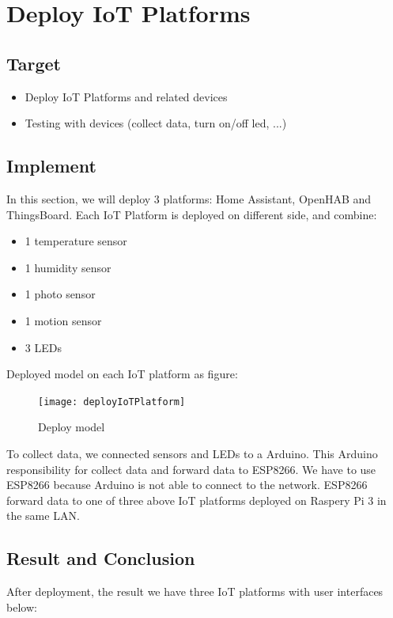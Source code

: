 \documentclass[runningheads,a4paper]{llncs}
\begin{document}
\section{Deploy IoT Platforms}
\subsection{Target}
\begin{itemize}
\item Deploy IoT Platforms and related devices
\item Testing with devices (collect data, turn on/off led, ...)\\
\end{itemize}

\subsection{Implement}

In this section, we will deploy 3 platforms: Home Assistant, OpenHAB and ThingsBoard. Each IoT Platform is deployed on different side, and combine:\\

\begin{itemize}
\item 1 temperature sensor\\
\item 1 humidity sensor\\
\item 1 photo sensor\\
\item 1 motion sensor\\
\item 3 LEDs\\
\end{itemize}

Deployed model on each IoT platform as figure:\\
\begin{figure}[H]
\centering
\texttt{[image: deployIoTPlatform]} 
\caption{Deploy model}
\end{figure} 

To collect data, we connected sensors and LEDs to a Arduino. This Arduino responsibility for collect data and forward data to ESP8266. We have to use ESP8266 because Arduino is not able  to connect to the network. ESP8266 forward data to one of three above IoT platforms deployed on Raspery Pi 3 in the same LAN.\\

\subsection{Result and Conclusion}
After deployment, the result we have three IoT platforms with user interfaces below:\\
\end{document}
